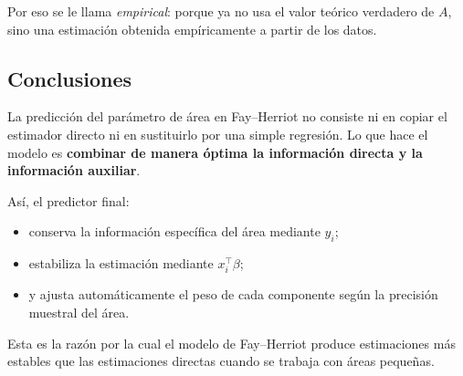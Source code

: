 Por eso se le llama \textit{empirical}: porque ya no usa el valor teórico verdadero de $A$, sino una estimación obtenida empíricamente a partir de los datos.

\subsection{Conclusiones}

La predicción del parámetro de área en Fay--Herriot no consiste ni en copiar el estimador directo ni en sustituirlo por una simple regresión. Lo que hace el modelo es \textbf{combinar de manera óptima la información directa y la información auxiliar}.

Así, el predictor final:
\begin{itemize}
    \item conserva la información específica del área mediante $y_i$;
    \item estabiliza la estimación mediante $x_i^{\top}\beta$;
    \item y ajusta automáticamente el peso de cada componente según la precisión muestral del área.
\end{itemize}

Esta es la razón por la cual el modelo de Fay--Herriot produce estimaciones más estables que las estimaciones directas cuando se trabaja con áreas pequeñas.